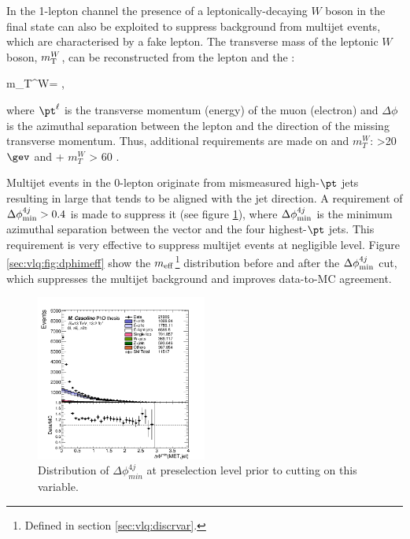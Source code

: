 In the 1-lepton channel the presence of a leptonically-decaying $W$ boson in the final state can also be exploited to suppress background from multijet events, which are characterised by a fake lepton. The transverse mass of the leptonic $W$ boson, $m_{\rm T}^{W}$, can be reconstructed from the lepton and the \MET:

\be
m_{\rm T}^{W}= ,
\label{sec:vlq:eq:mtw}
\ee

\noindent where $\pt^{\ell}$ is the transverse momentum (energy) of the muon (electron) and $\Delta \phi$ is the azimuthal separation between the lepton and the direction of the missing transverse momentum. Thus, additional requirements are made on \MET and $m_{T}^{W}$: \MET>20 $\gev$ and \MET + $m_{T}^{W}$ > 60 \gev.\par Multijet events in the 0-lepton originate from mismeasured high-$\pt$ jets resulting in large \MET that tends to be aligned with the jet direction. A requirement of $\Delta \phi_{\rm min}^{4j}>0.4$ is made to suppress it (see figure \ref{sec:vlq:fig:dphi}), where $\Delta \phi_{\rm min}^{4j}$ is the minimum azimuthal separation between the \MET vector and the four highest-$\pt$ jets. This requirement  is very effective to suppress multijet events at negligible level. Figure \ref{sec:vlq:fig:dphimeff} show the $m_{\rm eff}$\footnote{Defined in section \ref{sec:vlq:discrvar}. } distribution before and after the $\Delta \phi_{\rm min}^{4j}$ cut, which suppresses the multijet background and improves data-to-MC agreement.


\begin{figure}[t!]
  \centering
  \includegraphics[width=0.5\textwidth]{figures/VLQ/canv_c0l2b_dPhi_jetmet.png}
 \captionsetup{width=0.85\textwidth} \caption{\small Distribution of $\Delta \phi_{min}^{4j}$ at preselection level prior to cutting on this variable.}
  \label{sec:vlq:fig:dphi}
\end{figure}


